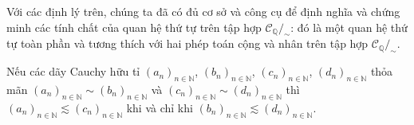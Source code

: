 Với các định lý trên, chúng ta đã có đủ cơ sở và công cụ để định nghĩa và chứng minh các tính chất của quan hệ thứ tự trên tập hợp $\mathscr{C}_{\mathbb{Q}}/_{\sim}$: đó là một quan hệ thứ tự toàn phần và tương thích với hai phép toán cộng và nhân trên tập hợp $\mathscr{C}_{\mathbb{Q}}/_{\sim}$.

\begin{appendixthm}\label{appendixthm:equivalent-cauchy-sequences-and-preorder}
    Nếu các dãy Cauchy hữu tỉ ${(a_{n})}_{n\in\mathbb{N}}$, ${(b_{n})}_{n\in\mathbb{N}}$, ${(c_{n})}_{n\in\mathbb{N}}$, ${(d_{n})}_{n\in\mathbb{N}}$ thỏa mãn ${(a_{n})}_{n\in\mathbb{N}}\sim {(b_{n})}_{n\in\mathbb{N}}$ và ${(c_{n})}_{n\in\mathbb{N}}\sim {(d_{n})}_{n\in\mathbb{N}}$ thì ${(a_{n})}_{n\in\mathbb{N}}\lesssim {(c_{n})}_{n\in\mathbb{N}}$ khi và chỉ khi ${(b_{n})}_{n\in\mathbb{N}}\lesssim {(d_{n})}_{n\in\mathbb{N}}$.
\end{appendixthm}

